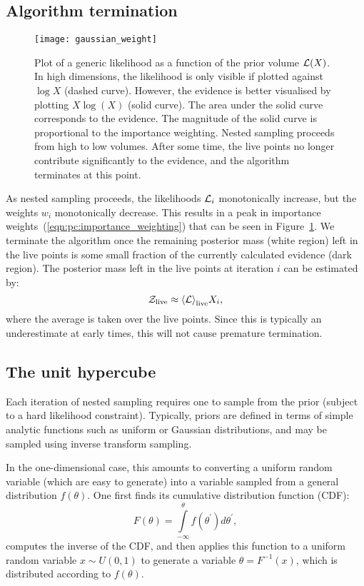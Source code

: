 \subsection{Algorithm termination}
\label{sec:pc:alg_term}
%
\begin{figure}
  \centering
  \texttt{[image: gaussian\_weight]}
  \caption{%
    Plot of a generic likelihood as a function of the prior volume $\mathcal{L}(X)$. In high dimensions, the likelihood is only visible if plotted against $\log X$ (dashed curve). However, the evidence is better visualised by plotting $X\log(X)$ (solid curve). The area under the solid curve corresponds to the evidence. The magnitude of the solid curve is proportional to the importance weighting. Nested sampling proceeds from high to low volumes. After some time, the live points no longer contribute significantly to the evidence, and the algorithm terminates at this point.\label{fig:pc:gaussian_weight}
  }
\end{figure}
%
As nested sampling proceeds, the likelihoods $\mathcal{L}_i$ monotonically increase, but the weights $w_i$ monotonically decrease. This results in a peak in importance weights~(\ref{eqn:pc:importance_weighting}) that can be seen in Figure~\ref{fig:pc:gaussian_weight}. We terminate the algorithm once the remaining posterior mass (white region) left in the live points is some small fraction of the currently calculated evidence (dark region). The posterior mass left in the live points at iteration $i$ can be estimated by:
\begin{equation}
  \mathcal{Z}_{\mathrm{live}} \approx {\left\langle{\mathcal{L}}\right\rangle}_{\mathrm{live}} X_i,
  \label{eqn:pc:live_evidence}
\end{equation}
where the average is taken over the live points. Since this is typically an underestimate at early times, this will not cause premature termination.


\subsection{The unit hypercube}
\label{sec:pc:unit_hypercube}
Each iteration of nested sampling requires one to sample from the prior (subject to a hard likelihood constraint). 
Typically, priors are defined in terms of simple analytic functions such as uniform or Gaussian distributions, and may be sampled using  inverse transform sampling. 

In the one-dimensional case, this amounts to converting a uniform random variable (which are easy to generate) into a variable sampled from a general distribution $f(\theta)$. One first finds its cumulative distribution function (CDF):
\begin{equation}
  F(\theta) = \int\limits_{-\infty}^\theta f(\theta^\prime) d\theta^\prime,
\end{equation}
computes the inverse of the CDF, and then applies this function to a uniform random variable  $x\sim U(0,1)$ to generate a variable $\theta = F^{-1}(x)$, which is distributed according to $f(\theta)$. 

